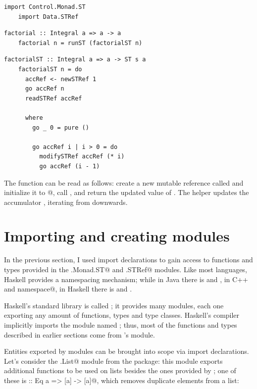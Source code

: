 \documentclass[UdineBachThesis,american,11pt,draft]{PhdThesis}
\begin{document}
  \begin{lstlisting}[gobble=4,basicstyle=\ttfamily\small]
    import Control.Monad.ST
    import Data.STRef
  \end{lstlisting}

  \begin{lstlisting}[gobble=4,basicstyle=\ttfamily\small]
    factorial :: Integral a => a -> a
    factorial n = runST (factorialST n)
  \end{lstlisting}

  \begin{lstlisting}[gobble=4,basicstyle=\ttfamily\small]
    factorialST :: Integral a => a -> ST s a
    factorialST n = do
      accRef <- newSTRef 1
      go accRef n
      readSTRef accRef

      where
        go _ 0 = pure ()

        go accRef i | i > 0 = do
          modifySTRef accRef (* i)
          go accRef (i - 1)
  \end{lstlisting}

  The function \lstinline@factorialST@ can be read as follows: create a new
  mutable reference called \lstinline@accRef@ and initialize it to
  @, call \lstinline@go@, and return the updated value of
  \lstinline@accRef@. The helper \lstinline@go@ updates the accumulator
  \lstinline@accRef@, iterating from \lstinline@n@ downwards.

  \section{Importing and creating modules}

  In the previous section, I used import declarations to gain access to
  functions and types provided in the \lstinline@Control.Monad.ST@ and
  \lstinline@Data.STRef@ modules. Like most languages, Haskell provides a
  namespacing mechanism; while in Java there is \lstinline@package@ and
  \lstinline@import@, in C++ \lstinline@namespace@ and
  \lstinline@using namespace@, in Haskell there is \lstinline@module@ and
  \lstinline@import@.

  Haskell's standard library is called \lstinline@base@; it provides many
  modules, each one exporting any amount of functions, types and type classes.
  Haskell's compiler implicitly imports the module named \lstinline@Prelude@;
  thus, most of the functions and types described in earlier sections come from
  \lstinline@base@'s \lstinline@Prelude@ module.

  Entities exported by modules can be brought into scope via import
  declarations. Let's consider the \lstinline@Data.List@ module from the
  \lstinline@base@ package: this module exports additional functions to be used
  on lists besides the ones provided by \lstinline@Prelude@; one of these is
  \lstinline@nub :: Eq a => [a] -> [a]@, which removes duplicate elements from a
  list:
\end{document}
